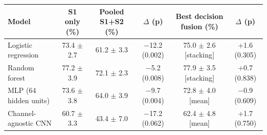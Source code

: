 \begin{tabular}{lccccc}
\toprule
\textbf{Model} & \textbf{S1 only (\%)} & \textbf{Pooled S1+S2 (\%)} & \textbf{$\Delta$ (p)} & \textbf{Best decision fusion (\%)} & \textbf{$\Delta$ (p) } \\
\midrule
Logistic regression & 73.4 $\pm$ 2.7 & 61.2 $\pm$ 3.3 & $-$12.2 (0.002) & 75.0 $\pm$ 2.6 [stacking] & +1.6 (0.305) \\
Random forest & 77.2 $\pm$ 3.9 & 72.1 $\pm$ 2.3 & $-$5.2 (0.008) & 77.9 $\pm$ 3.5 [stacking] & +0.7 (0.838) \\
MLP (64 hidden units) & 73.6 $\pm$ 3.8 & 64.0 $\pm$ 3.9 & $-$9.7 (0.004) & 72.8 $\pm$ 4.0 [mean] & $-$0.9 (0.609) \\
Channel-agnostic CNN & 60.7 $\pm$ 3.3 & 43.4 $\pm$ 7.0 & $-$17.2 (0.062) & 62.4 $\pm$ 4.8 [mean] & +1.7 (0.750) \\
\bottomrule
\end{tabular}
